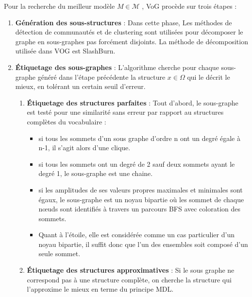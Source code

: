 Pour la recherche du meilleur modèle $ \textit{M} \in \mathcal{M} $ , VoG procède sur trois étapes :
\begin{enumerate}
 \item \textbf{Génération des sous-structures }: Dans cette phase, Les méthodes de détection de communautés et de clustering sont utilisées pour décomposer le graphe en sous-graphes pas forcément disjoints. La méthode de décomposition utilisée dans VOG est SlashBurn.  
 \item \textbf{Étiquetage des sous-graphes }: L'algorithme cherche pour chaque sous-graphe généré dans l'étape précédente la structure $x \in \Omega$ qui le décrit le mieux, en tolérant un certain seuil d'erreur.
  \begin{enumerate}[label=\alph*]
     \item \textbf{Étiquetage des structures parfaites} : Tout d'abord, le sous-graphe est testé pour une similarité sans erreur par rapport au structures complètes du vocabulaire :
\begin{itemize}[label=$\circ$]
	\item si tous les sommets d'un sous graphe d'ordre n ont un degré égale à n-1, il s'agit alors d'une clique.
	\item si tous les sommets ont un degré de 2 sauf deux sommets ayant le degré 1, le  sous-graphe est une chaine.
	\item si les amplitudes de ses valeurs propres maximales et minimales sont égaux, le sous-graphe est un noyau bipartie où les sommet de chaque nœuds sont identifiés à travers un parcours BFS avec coloration des sommets.
	\item  Quant à l'étoile, elle est considérée comme un cas particulier d'un noyau bipartie, il suffit donc que l'un des ensembles soit composé d'un seule sommet.
\end{itemize}     
     \item \textbf{Étiquetage des structures approximatives }: Si le sous graphe ne correspond pas à une structure complète, on cherche la structure qui l'approxime le mieux en terme du principe MDL.
     

\end{enumerate}
\end{enumerate}
